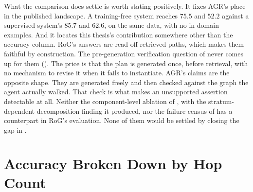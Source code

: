 What the comparison does settle is worth stating positively. It fixes AGR's
place in the published landscape. A training-free system reaches $75.5$ and
$52.2$ against a supervised system's $85.7$ and $62.6$, on the same data, with
no in-domain examples. And it locates this thesis's contribution somewhere other
than the accuracy column. RoG's answers are read off retrieved paths, which
makes them faithful by construction. The pre-generation verification question of
 never comes up for them ().
The price is that the plan is generated once, before retrieval, with no
mechanism to revise it when it fails to instantiate. AGR's claims are the
opposite shape. They are generated freely and then checked against the graph the
agent actually walked. That check is what makes an unsupported assertion
detectable at all. Neither the component-level ablation of ,
with the stratum-dependent decomposition finding it produced, nor the failure
census of  has a counterpart in RoG's evaluation. None
of them would be settled by closing the gap in .

\section{Accuracy Broken Down by Hop Count}\label{sec:hop-results}

